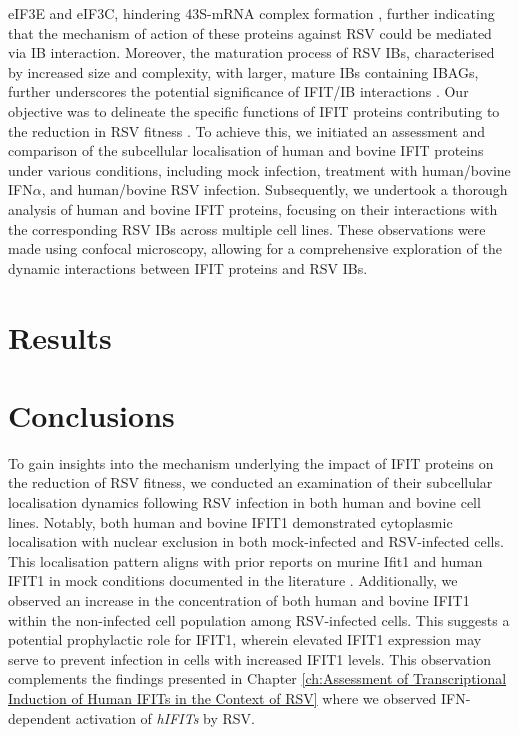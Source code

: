 eIF3E and eIF3C, hindering 43S-mRNA complex formation \cite{Diamond2014IFIT1:Translation, Guo2000CharacterizationVirus}, further indicating that the mechanism of action of these proteins against RSV could be mediated via IB interaction. Moreover, the maturation process of RSV IBs, characterised by increased size and complexity, with larger, mature IBs containing IBAGs, further underscores the potential significance of IFIT/IB interactions \cite{Rincheval2017FunctionalVirus, Jobe2021BovineResponses}. Our objective was to delineate the specific functions of IFIT proteins contributing to the reduction in RSV fitness \cite{Drori2020InfluenzaProteins}. To achieve this, we initiated an assessment and comparison of the subcellular localisation of human and bovine IFIT proteins under various conditions, including mock infection, treatment with human/bovine IFN\(\alpha\), and human/bovine RSV infection. Subsequently, we undertook a thorough analysis of human and bovine IFIT proteins, focusing on their interactions with the corresponding RSV IBs across multiple cell lines. These observations were made using confocal microscopy, allowing for a comprehensive exploration of the dynamic interactions between IFIT proteins and RSV IBs.

\section{Results} \label{sec:Results-Chapter3}



\section{Conclusions} \label{sec:Conclusions-Chapter3}
To gain insights into the mechanism underlying the impact of IFIT proteins on the reduction of RSV fitness, we conducted an examination of their subcellular localisation dynamics following RSV infection in both human and bovine cell lines. Notably, both human and bovine IFIT1 demonstrated cytoplasmic localisation with nuclear exclusion in both mock-infected and RSV-infected cells. This localisation pattern aligns with prior reports on murine Ifit1 and human IFIT1 in mock conditions documented in the literature \cite{Pichlmair2011IFIT1RNA, Terenzi2008Interferon-inducibleE1, Thul2017AProteome}. Additionally, we observed an increase in the concentration of both human and bovine IFIT1 within the non-infected cell population among RSV-infected cells. This suggests a potential prophylactic role for IFIT1, wherein elevated IFIT1 expression may serve to prevent infection in cells with increased IFIT1 levels. This observation complements the findings presented in Chapter \ref{ch:Assessment of Transcriptional Induction of Human IFITs in the Context of RSV} where we observed IFN-dependent activation of \textit{hIFITs} by RSV.

